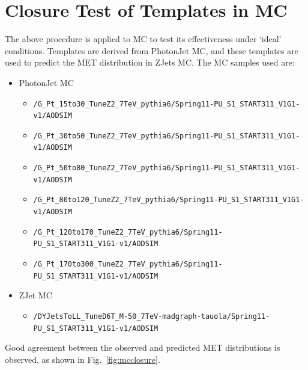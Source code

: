 
\section{Closure Test of Templates in MC}
\label{sec:mc}

The above procedure is applied to MC to test its effectiveness under `ideal' conditions. Templates are derived from PhotonJet MC, 
and these templates are used to predict the MET distribution in ZJets MC. The MC samples used are:
\begin{itemize}
\item PhotonJet MC
  \begin{itemize}
  \item \verb=/G_Pt_15to30_TuneZ2_7TeV_pythia6/Spring11-PU_S1_START311_V1G1-v1/AODSIM  =
  \item \verb=/G_Pt_30to50_TuneZ2_7TeV_pythia6/Spring11-PU_S1_START311_V1G1-v1/AODSIM  =
  \item \verb=/G_Pt_50to80_TuneZ2_7TeV_pythia6/Spring11-PU_S1_START311_V1G1-v1/AODSIM  =
  \item \verb=/G_Pt_80to120_TuneZ2_7TeV_pythia6/Spring11-PU_S1_START311_V1G1-v1/AODSIM =
  \item \verb=/G_Pt_120to170_TuneZ2_7TeV_pythia6/Spring11-PU_S1_START311_V1G1-v1/AODSIM=
  \item \verb=/G_Pt_170to300_TuneZ2_7TeV_pythia6/Spring11-PU_S1_START311_V1G1-v1/AODSIM= 	  
  \end{itemize}
\item ZJet MC
  \begin{itemize}
  \item \verb=/DYJetsToLL_TuneD6T_M-50_7TeV-madgraph-tauola/Spring11-PU_S1_START311_V1G1-v1/AODSIM=
  \end{itemize}
\end{itemize}

Good agreement between the observed and predicted MET distributions is observed, as shown in Fig.~\ref{fig:mcclosure}.

